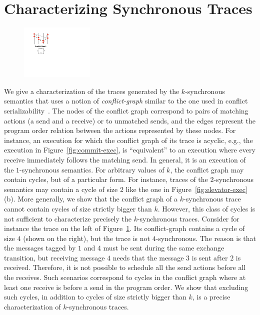 \section{Characterizing Synchronous Traces}\label{sec:characterizations}

\begin{figure}
\includegraphics[width=3.5cm]{ex-rs-cycle.pdf}
\caption{ }
\label{fig:ex-rs-cycle}
\vspace{-6mm}
\end{figure}
We give a characterization of the traces generated by the $k$-synchronous semantics that uses a notion of \emph{conflict-graph} similar to the one used in conflict serializability~\cite{journals/jacm/Papadimitriou79b}. The nodes of the conflict graph correspond to pairs of matching actions (a send and a receive) or to unmatched sends, and the edges represent the program order relation between the actions represented by these nodes. 
For instance, an execution for which the conflict graph of its trace is acyclic, e.g., the execution in Figure~\ref{fig:commit-exec}, is ``equivalent'' to an execution where every receive immediately follows the matching send. 
In general, it is an execution of the $1$-synchronous semantics. For arbitrary values of $k$, the conflict graph may contain cycles, but of a particular form. For instance, traces of the $2$-synchronous semantics may contain a cycle of size 2 like the one in Figure~\ref{fig:elevator-exec}(b). More generally, we show that the conflict graph of a $k$-synchronous trace cannot contain cycles of size strictly bigger than $k$. However, this class of cycles is not sufficient to characterize precisely the $k$-synchronous traces. Consider for instance the trace on the left of Figure~\ref{fig:ex-rs-cycle}. Its conflict-graph contains a cycle of size $4$ (shown on the right), but the trace is not $4$-synchronous. The reason is that the messages tagged by $1$ and $4$ must be sent during the same exchange transition, but receiving message $4$ needs that the message $3$ is sent after $2$ is received. Therefore, it is not possible to schedule all the send actions before all the receives. Such scenarios correspond to cycles in the conflict graph where at least one receive is before a send in the program order. We show that excluding such cycles, in addition to cycles of size strictly bigger than $k$, is a precise characterization of $k$-synchronous traces.



